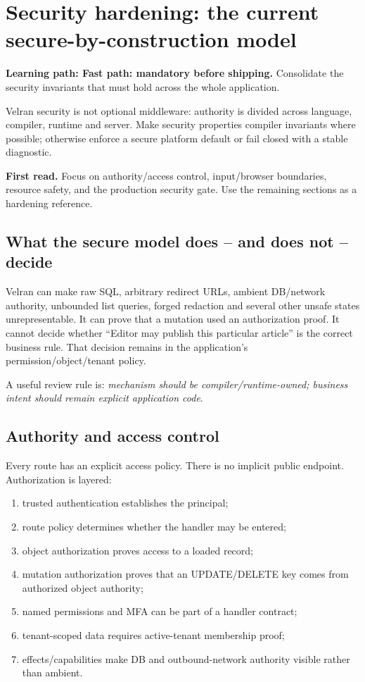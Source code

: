 \chapter{Security hardening: the current secure-by-construction model}

\noindent\textbf{Learning path: Fast path: mandatory before shipping.} Consolidate the security invariants that must hold across the whole application.\par\medskip

Velran security is not optional middleware: authority is divided across language, compiler, runtime and server. Make security properties compiler invariants where possible; otherwise enforce a secure platform default or fail closed with a stable diagnostic.

\noindent\textbf{First read.} Focus on authority/access control, input/browser boundaries, resource safety, and the production security gate. Use the remaining sections as a hardening reference.\par\medskip

\section{What the secure model does -- and does not -- decide}

Velran can make raw SQL, arbitrary redirect URLs, ambient DB/network authority, unbounded list queries, forged redaction and several other unsafe states unrepresentable. It can prove that a mutation used an authorization proof. It cannot decide whether ``Editor may publish this particular article'' is the correct business rule. That decision remains in the application's permission/object/tenant policy.

A useful review rule is: \emph{mechanism should be compiler/runtime-owned; business intent should remain explicit application code}.

\section{Authority and access control}

Every route has an explicit access policy. There is no implicit public endpoint. Authorization is layered:

\begin{enumerate}
  \item trusted authentication establishes the principal;
  \item route policy determines whether the handler may be entered;
  \item object authorization proves access to a loaded record;
  \item mutation authorization proves that an UPDATE/DELETE key comes from authorized object authority;
  \item named permissions and MFA can be part of a handler contract;
  \item tenant-scoped data requires active-tenant membership proof;
  \item effects/capabilities make DB and outbound-network authority visible rather than ambient.
\end{enumerate}

